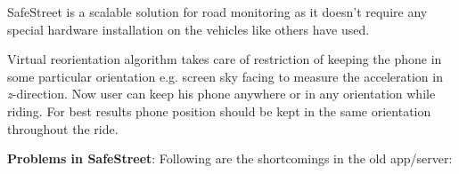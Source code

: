 \documentclass[12pt]{report}
\begin{document}
SafeStreet is a scalable solution for road
monitoring as it doesn't require any special hardware installation on the
vehicles like others \cite[]{eriksson2008pothole} have used.

Virtual reorientation algorithm \cite[]{bhushan} \cite[]{auro} takes care of
restriction of keeping the phone in some particular orientation e.g. screen sky
facing to measure the acceleration in \textit{z}-direction. Now user can keep
his phone anywhere or in any orientation while riding. For best results phone
position should be kept in the same orientation throughout the ride.



\textbf{Problems in SafeStreet}: Following are the shortcomings in the old
app/server:
\end{document}
